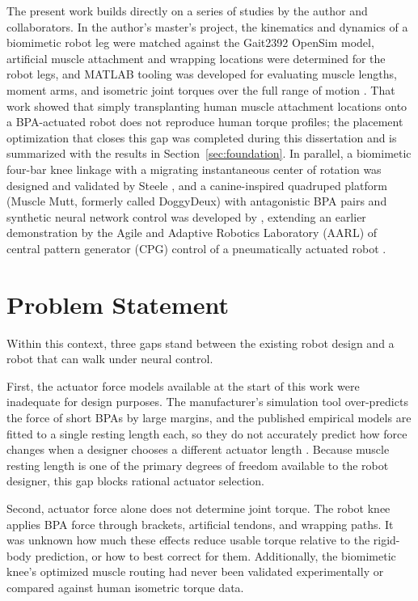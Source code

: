 The present work builds directly on a series of studies by the author and collaborators. In the author's master's project, the kinematics and dynamics of a biomimetic robot leg were matched against the Gait2392 OpenSim model, artificial muscle attachment and wrapping locations were determined for the robot legs, and MATLAB tooling was developed for evaluating muscle lengths, moment arms, and isometric joint torques over the full range of motion \citep{bolen_bipedal_2019, bolen_determination_2019}. That work showed that simply transplanting human muscle attachment locations onto a BPA-actuated robot does not reproduce human torque profiles; the placement optimization that closes this gap was completed during this dissertation and is summarized with the results in Section~\ref{sec:foundation}. In parallel, a biomimetic four-bar knee linkage with a migrating instantaneous center of rotation was designed and validated by Steele \citep{steele_development_2017, steele_biomimetic_2018, steele_biomimetic_2018-1}, and a canine-inspired quadruped platform (Muscle Mutt, formerly  called DoggyDeux) with antagonistic BPA pairs and synthetic neural network control was developed by \citet{scharzenberger_design_2019}, extending an earlier demonstration by the Agile and Adaptive Robotics Laboratory (AARL) of central pattern generator (CPG) control of a pneumatically actuated robot \citep{hunt_development_2017}.

\section{Problem Statement}\label{sec:problem}

Within this context, three gaps stand between the existing robot design and a robot that can walk under neural control.

First, the actuator force models available at the start of this work were inadequate for design purposes. The manufacturer's simulation tool over-predicts the force of short BPAs by large margins, and the published empirical models are fitted to a single resting length each, so they do not accurately predict how force changes when a designer chooses a different actuator length \citep{sarosi_comparative_2017, martens_modeling_2017, hunt_modeling_2017}. Because muscle resting length is one of the primary degrees of freedom available to the robot designer, this gap blocks rational actuator selection.

Second, actuator force alone does not determine joint torque. The robot knee applies BPA force through brackets, artificial tendons, and wrapping paths. It was unknown how much these effects reduce usable torque relative to the rigid-body prediction, or how to best correct for them. Additionally, the biomimetic knee's optimized muscle routing \citep{morrow_optimization_2020} had never been validated experimentally or compared against human isometric torque data.

